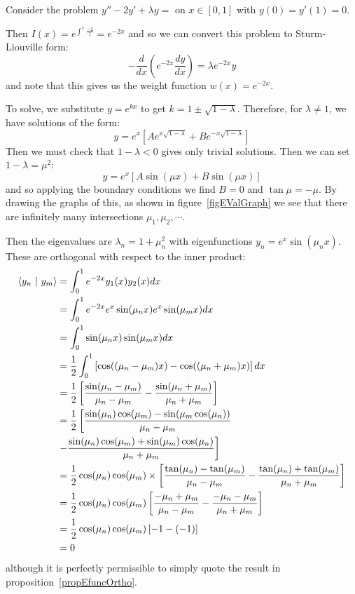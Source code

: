 \documentclass[../Main.tex]{subfiles}
\begin{document}
\begin{example}
    Consider the problem $y'' - 2y' + \lambda y = $ on $x \in [0, 1]$ with $y(0) = y'(1) = 0$.

    Then $I(x) = e^{\int^x \frac{-2}{1}} = e^{-2x}$ and so we can convert this problem to Sturm-Liouville form:
    \begin{equation*}
        -\frac{d}{dx}\left(e^{-2x} \frac{dy}{dx}\right) = \lambda e^{-2x} y
    \end{equation*}
    and note that this gives us the weight function $w(x) = e^{-2x}$.

    To solve, we substitute $y = e^{kx}$ to get $k = 1 \pm \sqrt{1 - \lambda}$. Therefore, for $\lambda \neq 1$, we have solutions of the form:
    \begin{equation*}
        y = e^x\left[Ae^{x\sqrt{1-\lambda}} + Be^{-x\sqrt{1-\lambda}}\right]
    \end{equation*}
    Then we must check that $1-\lambda < 0$ gives only trivial solutions. Then we can set $1 - \lambda = \mu^2$:
    \begin{equation*}
        y = e^x\left[A\sin(\mu x) + B\sin(\mu x)\right]
    \end{equation*}
    and so applying the boundary conditions we find $B = 0$ and $\tan{\mu} = -\mu$. By drawing the graphs of this, as shown in figure~\ref{figEValGraph} we see that there are infinitely many intersections $\mu_1, \mu_2, \cdots$.
    

    Then the eigenvalues are $\lambda_n = 1 + \mu_n^2$ with eigenfunctions $y_n = e^x \sin(\mu_n x)$. These are orthogonal with respect to the inner product:
    \begin{align*}
        \langle y_n~\vert~y_m\rangle &= \int_{0}^{1} e^{-2x}y_1(x) y_2(x) dx \\
        &= \int_{0}^{1} e^{-2x} e^x \sin(\mu_n x) e^x \sin(\mu_m x) dx \\
        &= \int_{0}^{1} \sin(\mu_n x) \sin(\mu_m x) dx \\
        &= \frac12 \int_{0}^{1} \left[\cos((\mu_n - \mu_m)x) - \cos((\mu_n + \mu_m)x)\right] dx \\
        &= \frac12 \left[\frac{\sin(\mu_n - \mu_m)}{\mu_n - \mu_m} - \frac{\sin(\mu_n + \mu_m)}{\mu_n + \mu_m}\right] \\
        &= \frac12 \left[ \frac{\sin(\mu_n) \cos(\mu_m) - \sin(\mu_m \cos(\mu_n))}{\mu_n - \mu_m}\right. \\
        &\left. - \frac{\sin(\mu_n) \cos(\mu_m) + \sin(\mu_m) \cos(\mu_n)}{\mu_n + \mu_m} \right] \\
        &= \frac12 \cos(\mu_n) \cos(\mu_m) \times \left[\frac{\tan(\mu_n) - \tan(\mu_m)}{\mu_n - \mu_m} - \frac{\tan(\mu_n) + \tan(\mu_m)}{\mu_n + \mu_m}\right] \\
        &= \frac12 \cos(\mu_n) \cos(\mu_m) \left[\frac{-\mu_n + \mu_m}{\mu_n - \mu_m} - \frac{-\mu_n - \mu_m}{\mu_n + \mu_m}\right] \\
        &= \frac12 \cos(\mu_n) \cos(\mu_m) \left[-1 - (-1) \right] \\
        &=0
    \end{align*}
    although it is perfectly permissible to simply quote the result in proposition~\ref{propEfuncOrtho}.
\end{example}
\end{document}
